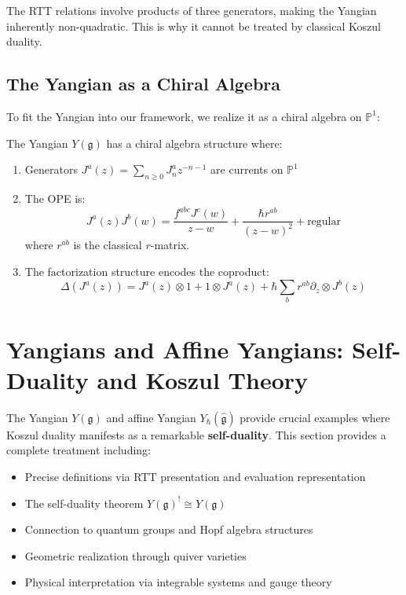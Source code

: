 \begin{remark}
The RTT relations involve products of three generators, making the Yangian inherently non-quadratic. This is why it cannot be treated by classical Koszul duality.
\end{remark}

\subsection{The Yangian as a Chiral Algebra}

To fit the Yangian into our framework, we realize it as a chiral algebra on $\mathbb{P}^1$:

\begin{theorem}
The Yangian $Y(\mathfrak{g})$ has a chiral algebra structure where:
\begin{enumerate}
\item Generators $J^a(z) = \sum_{n \geq 0} J_n^a z^{-n-1}$ are currents on $\mathbb{P}^1$

\item The OPE is:
$$J^a(z)J^b(w) = \frac{f^{abc}J^c(w)}{z-w} + \frac{\hbar r^{ab}}{(z-w)^2} + \text{regular}$$
where $r^{ab}$ is the classical $r$-matrix.

\item The factorization structure encodes the coproduct:
$$\Delta(J^a(z)) = J^a(z) \otimes 1 + 1 \otimes J^a(z) + \hbar\sum_b r^{ab} \partial_z \otimes J^b(z)$$
\end{enumerate}
\end{theorem}


\section{Yangians and Affine Yangians: Self-Duality and Koszul Theory}
\label{sec:yangians-complete}

\begin{remark}
The Yangian $Y(\mathfrak{g})$ and affine Yangian $Y_{\hbar}(\widehat{\mathfrak{g}})$ 
provide crucial examples where Koszul duality manifests as a remarkable 
\textbf{self-duality}. This section provides a complete treatment including:
\begin{itemize}
\item Precise definitions via RTT presentation and evaluation representation
\item The self-duality theorem $Y(\mathfrak{g})^! \cong Y(\mathfrak{g})$
\item Connection to quantum groups and Hopf algebra structures
\item Geometric realization through quiver varieties
\item Physical interpretation via integrable systems and gauge theory
\end{itemize}
\end{remark}

